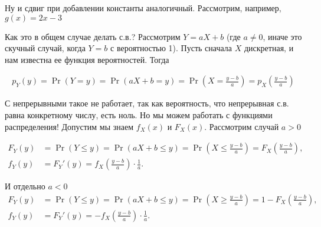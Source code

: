 \documentclass[12pt]{article}
\begin{document}
Ну и сдвиг при добавлении константы аналогичный. Рассмотрим, например, $g(x) = 2x - 3$

\begin{center}
\end{center}

Как это в общем случае делать с.в.? Рассмотрим $Y = aX + b$ (где $a \ne 0$, иначе это скучный случай, когда $Y = b$ с вероятностью 1). Пусть сначала $X$ дискретная, и нам известна ее функция вероятностей. Тогда

\begin{align*}
  p_Y(y) = \Pr(Y = y) = \Pr(aX + b = y) = \Pr\left(X = \frac{y - b}{a}\right) = p_X\left( \frac{y - b}{a}\right)
\end{align*}

С непрерывными такое не работает, так как вероятность, что непрерывная с.в. равна конкретному числу, есть ноль. Но мы можем работать с функциями распределения! Допустим мы знаем $f_X(x)$ и $F_X(x)$. Рассмотрим случай $a > 0$

\begin{align*}
  F_Y(y) &= \Pr(Y \le y) = \Pr(aX + b \le y) = \Pr\left(X \le \frac{y - b}{a}\right) = F_X\left(\frac{y - b}{a}\right), \\
  f_Y(y) &= F_Y'(y) = f_X\left(\frac{y - b}{a}\right) \cdot \frac{1}{a}.
\end{align*}

И отдельно $a < 0$
\begin{align*}
  F_Y(y) &= \Pr(Y \le y) = \Pr(aX + b \le y) = \Pr\left(X \ge \frac{y - b}{a}\right) = 1 - F_X\left(\frac{y - b}{a}\right), \\
  f_Y(y) &= F_Y'(y) = -f_X\left(\frac{y - b}{a}\right) \cdot \frac{1}{a}.
\end{align*}
\end{document}
